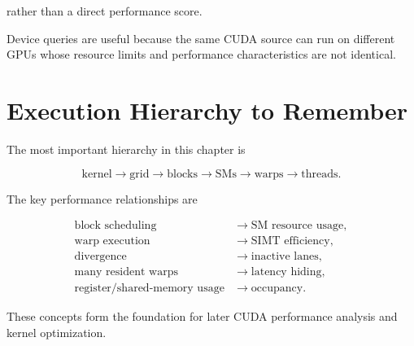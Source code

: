 \documentclass[11pt,a4paper]{article}
\begin{document}
rather than a direct performance score.

Device queries are useful because the same CUDA source can run on different GPUs whose resource limits and performance characteristics are not identical.

\section{Execution Hierarchy to Remember}

The most important hierarchy in this chapter is

\[
\boxed{
\text{kernel}
\rightarrow
\text{grid}
\rightarrow
\text{blocks}
\rightarrow
\text{SMs}
\rightarrow
\text{warps}
\rightarrow
\text{threads}.
}
\]

The key performance relationships are

\[
\begin{aligned}
\text{block scheduling}
&\rightarrow
\text{SM resource usage},\\
\text{warp execution}
&\rightarrow
\text{SIMT efficiency},\\
\text{divergence}
&\rightarrow
\text{inactive lanes},\\
\text{many resident warps}
&\rightarrow
\text{latency hiding},\\
\text{register/shared-memory usage}
&\rightarrow
\text{occupancy}.
\end{aligned}
\]

These concepts form the foundation for later CUDA performance analysis and kernel optimization.
\end{document}
